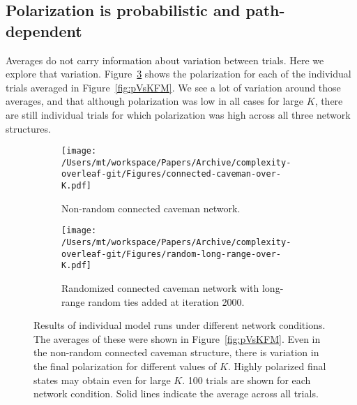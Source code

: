 \subsection{Polarization is probabilistic and path-dependent}

Averages do not carry information about variation between trials. Here we explore that variation. Figure~\ref{fig:single-experiments-over-k} shows the polarization for each of the individual trials averaged in Figure~\ref{fig:pVsKFM}. We see a lot of variation around those averages, and that although polarization was low in all cases for large $K$, there are still individual trials for which polarization was high across all three network structures. 

\begin{figure}[H]
  \centering
    \begin{subfigure}[t]{\textwidth}
      \centering
      \texttt{[image: /Users/mt/workspace/Papers/Archive/complexity-overleaf-git/Figures/connected-caveman-over-K.pdf]}
      \caption{Non-random connected caveman network.}
      \label{fig:connected-caveman-trials}
    \end{subfigure}
    \begin{subfigure}[t]{\textwidth}
      \centering
      \texttt{[image: /Users/mt/workspace/Papers/Archive/complexity-overleaf-git/Figures/random-long-range-over-K.pdf]}
      \caption{Randomized connected caveman network with long-range random ties added at iteration 2000.}
      \label{fig:random-anyrange-trials}
    \end{subfigure}
  \caption{Results of individual model runs under different network conditions. 
    The averages of these were shown in Figure~\ref{fig:pVsKFM}.
    Even in the non-random connected caveman structure, there is 
    variation in the final polarization for different values of $K$. Highly
    polarized final states may obtain even for large $K$. 100 trials are shown for each 
    network condition. Solid lines indicate the average across all trials.}
  \label{fig:single-experiments-over-k}
\end{figure}

